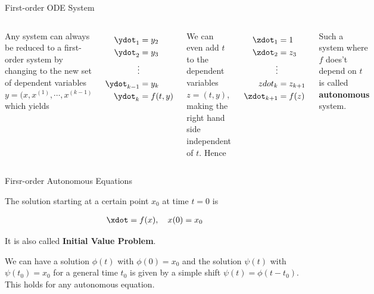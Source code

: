 \documentclass[aspectratio=169,xcolor=dvipsnames,svgnames,x11names,fleqn]{beamer}
\begin{document}
    \begin{frame}{First-order ODE System}

\begin{columns}


    
    Any system can always be reduced to a first-order system by
changing to the new set of dependent variables $y = (x, x^{(1)}, \cdots , x^{(k-1)}$ which yields

\begin{align*}
\ydot_1 & = y_2\\
\ydot_2 & = y_3\\
\vdots\\
\ydot_{k-1} & = y_k\\
\ydot_k & = f(t,y)
\end{align*}

\pause




We can even add $t$ to the dependent variables $z = (t,y)$, making the right hand side independent of $t$. Hence

\begin{align*}
\zdot_1 &  = 1\\
\zdot_2 & = z_3\\
\vdots\\
zdot_k & = z_{k+1}\\
\zdot_{k+1} & = f(z)
\end{align*}

Such a system where $f$ does't depend on $t$ is called \textbf{autonomous} system.


\end{columns}    


    \end{frame}
    
    \begin{frame}{Firsr-order Autonomous Equations}
    
    The solution starting at a certain point $x_0$ at
time $t = 0$ is
    
    \begin{align*}
    \xdot = f(x), \quad x(0) = x_0
    \end{align*}
    
    It is also called \textbf{Initial Value Problem}.
    
    We can have a solution $\phi(t)$ with $\phi(0) = x_0$ and the solution $\psi(t)$ with $\psi(t_0) = x_0$ for a general time $t_0$ is given by a simple shift $\psi(t) = \phi(t-t_0)$. This holds for any autonomous equation.
    
    \end{frame}
\end{document}
